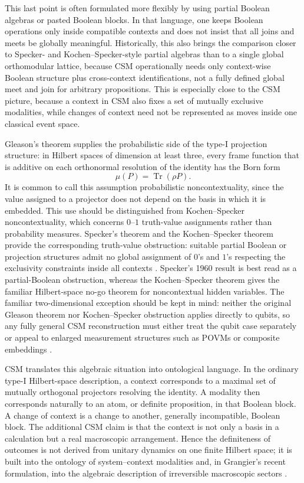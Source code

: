 \documentclass[
aps,
pra,
reprint,
superscriptaddress,
nofootinbib,
longbibliography
]{revtex4-2}
\begin{document}
This last point is often formulated more flexibly by using partial Boolean
algebras or pasted Boolean blocks.  In that language, one keeps Boolean
operations only inside compatible contexts and does not insist that all joins
and meets be globally meaningful.  Historically, this also brings the
comparison closer to Specker- and Kochen--Specker-style partial algebras than
to a single global orthomodular lattice, because CSM operationally needs only
context-wise Boolean structure plus cross-context identifications, not a fully
defined global meet and join for arbitrary propositions.  This is especially
close to the CSM picture, because a context in CSM also fixes a set of mutually
exclusive modalities, while changes of context need not be represented as
moves inside one classical event space.

Gleason's theorem supplies the probabilistic side of the type-I projection
structure: in Hilbert spaces of dimension at least three, every frame function
that is additive on each orthonormal resolution of the identity has the Born
form
\begin{equation}
\mu(P)=\operatorname{Tr}(\rho P).
\end{equation}
It is common to call this assumption probabilistic noncontextuality, since the
value assigned to a projector does not depend on the basis in which it is
embedded.  This use should be distinguished from Kochen--Specker
noncontextuality, which concerns $0$--$1$ truth-value assignments rather than
probability measures.  Specker's theorem and the Kochen--Specker theorem
provide the corresponding truth-value obstruction: suitable partial Boolean
or projection structures admit no global assignment of $0$'s and $1$'s
respecting the exclusivity constraints inside all contexts
\cite{specker1960,kochen1967}.  Specker's 1960 result is best read as a
partial-Boolean obstruction, whereas the Kochen--Specker theorem gives the
familiar Hilbert-space no-go theorem for noncontextual hidden variables.
The familiar two-dimensional exception should be kept in mind: neither the
original Gleason theorem nor Kochen--Specker obstruction applies directly to
qubits, so any fully general CSM reconstruction must either treat the qubit
case separately or appeal to enlarged measurement structures such as POVMs or
composite embeddings \cite{busch2003,caves2004}.

CSM translates this algebraic situation into ontological language.  In the
ordinary type-I Hilbert-space description, a context corresponds to a maximal
set of mutually orthogonal projectors resolving the identity.  A modality then
corresponds naturally to an atom, or definite proposition, in that Boolean
block.  A change of context is a change to another, generally incompatible,
Boolean block.  The additional CSM claim is that the context is not only a
basis in a calculation but a real macroscopic arrangement.  Hence the
definiteness of outcomes is not derived from unitary dynamics on one finite
Hilbert space; it is built into the ontology of system--context modalities
and, in Grangier's recent formulation, into the algebraic description of
irreversible macroscopic sectors \cite{grangier2026,haag1996}.
\end{document}
